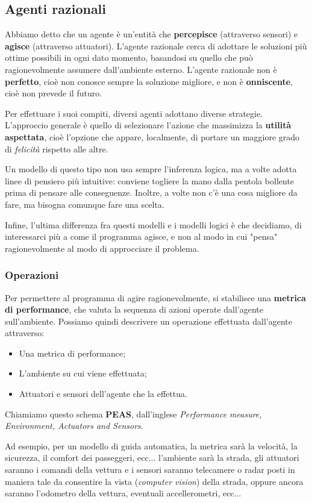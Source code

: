 \documentclass[a4paper,11pt]{article}
\begin{document}
\subsection{Agenti razionali}
Abbiamo detto che un agente è un'entità che \textbf{percepisce} (attraverso sensori) e \textbf{agisce} (attraverso attuatori).
L'agente razionale cerca di adottare le soluzioni più ottime possibili in ogni dato momento, basandosi su quello che può ragionevolmente assumere dall'ambiente esterno.
L'agente razionale non è \textbf{perfetto}, cioè non conosce sempre la soluzione migliore, e non è \textbf{onniscente}, cioè non prevede il futuro.

Per effettuare i suoi compiti, diversi agenti adottano diverse strategie.
L'approccio generale è quello di selezionare l'azione che massimizza la \textbf{utilità aspettata}, cioè l'opzione che appare, localmente, di portare un maggiore grado di \textit{felicità} rispetto alle altre.

Un modello di questo tipo non usa sempre l'inferenza logica, ma a volte adotta linee di pensiero più intuitive: conviene togliere la mano dalla pentola bollente prima di pensare alle conseguenze.
Inoltre, a volte non c'è una cosa migliore da fare, ma bisogna comunque fare una scelta.

Infine, l'ultima differenza fra questi modelli e i modelli logici è che decidiamo, di interessarci più a come il programma agisce, e non al modo in cui "pensa" ragionevolmente al modo di approcciare il problema.

\subsubsection{Operazioni}
Per permettere al programma di agire ragionevolmente, si stabilisce una \textbf{metrica di performance}, che valuta la sequenza di azioni operate dall'agente sull'ambiente.
Possiamo quindi descrivere un operazione effettuata dall'agente attraverso:
\begin{itemize}
	\item Una metrica di performance;
	\item L'ambiente su cui viene effettuata;
	\item Attuatori e sensori dell'agente che la effettua.
\end{itemize}

Chiamiamo questo schema \textbf{PEAS}, dall'inglese \textit{Performance measure, Environment, Actuators and Sensors}.

Ad esempio, per un modello di guida automatica, la metrica sarà la velocità, la sicurezza, il comfort dei passeggeri, ecc... l'ambiente sarà la strada, gli attuatori saranno i comandi della vettura e i sensori saranno telecamere o radar posti in maniera tale da consentire la vista (\textit{computer vision}) della strada, oppure ancora saranno l'odometro della vettura, eventuali accellerometri, ecc...
\end{document}
